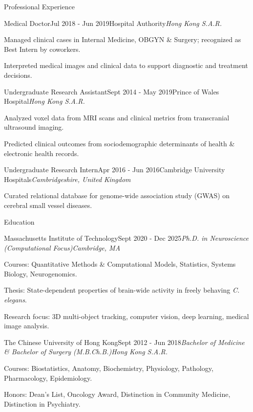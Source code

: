 \documentclass{resume} %
\begin{document}
\begin{rSection}{Professional Experience}
\begin{rSubsection}{Medical Doctor}{Jul 2018 - Jun 2019}{Hospital Authority}{\textit{Hong Kong S.A.R.}}
  \item Managed clinical cases in Internal Medicine, OBGYN \& Surgery; recognized as Best Intern by coworkers.
  \item Interpreted medical images and clinical data to support diagnostic and treatment decisions.
\end{rSubsection}

\begin{rSubsection}{Undergraduate Research Assistant}{Sept 2014 - May 2019}{Prince of Wales Hospital}{\textit{Hong Kong S.A.R.}}
  \item Analyzed voxel data from MRI scans and clinical metrics from transcranial ultrasound imaging.
  \item Predicted clinical outcomes from sociodemographic determinants of health \& electronic health records.
\end{rSubsection}

\begin{rSubsection}{Undergraduate Research Intern}{Apr 2016 - Jun 2016}{Cambridge University Hospitals}{\textit{Cambridgeshire, United Kingdom}}
  \item Curated relational database for genome-wide association study (GWAS) on cerebral small vessel diseases.
\end{rSubsection}

\end{rSection}

\begin{rSection}{Education}

\begin{rSubsection}{Massachusetts Institute of Technology}{Sept 2020 - Dec 2025}{\textit{Ph.D. in Neuroscience (Computational Focus)}}{\textit{Cambridge, MA}}
  \item Courses: Quantitative Methods \& Computational Models, Statistics, Systems Biology, Neurogenomics.
  \item Thesis: State-dependent properties of brain-wide activity in freely behaving \textit{C. elegans}.
  \item Research focus: 3D multi-object tracking, computer vision, deep learning, medical image analysis.
\end{rSubsection}

\begin{rSubsection}{The Chinese University of Hong Kong}{Sept 2012 - Jun 2018}{\textit{Bachelor of Medicine \& Bachelor of Surgery (M.B.Ch.B.)}}{\textit{Hong Kong S.A.R.}}
  \item Courses: Biostatistics, Anatomy, Biochemistry, Physiology, Pathology, Pharmacology, Epidemiology.
  \item Honors: Dean's List, Oncology Award, Distinction in Community Medicine, Distinction in Psychiatry.
\end{rSubsection}
\end{rSection}
\end{document}
